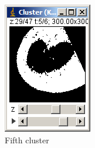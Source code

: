 \documentclass[11pt]{article} %
\begin{document}
\begin{figure}
\begin{subfigure}[b]{0.3\textwidth}
                \includegraphics[width=\textwidth]{figures/k-means_results_5}
                \caption{Fifth cluster}
                \label{fig:k-means_res_5}
	\end{subfigure}%
	 ~
        \begin{subfigure}[b]{0.3\textwidth}
                \centering

\end{subfigure}
\end{figure}
\end{document}

